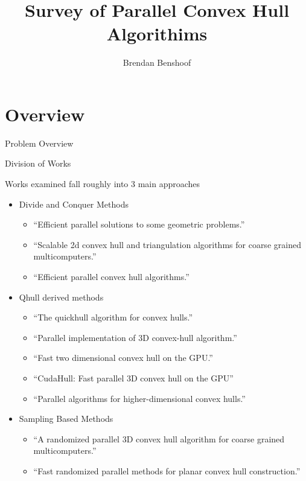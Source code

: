 \documentclass[11pt]{beamer}
\author{Brendan Benshoof}
\title{Survey of Parallel Convex Hull Algorithims}
\begin{document}
\setcounter{tocdepth}{3}
\begin{frame}
\titlepage
\end{frame}

\section{Overview}
\begin{frame}{Problem Overview}
\end{frame}


\begin{frame}{Division of Works}

Works examined fall roughly into 3 main approaches
\begin{itemize}
\item{ Divide and Conquer Methods}
\begin{itemize}
\item{``Efficient parallel solutions to some geometric problems.''}
\item{ ``Scalable 2d convex hull and triangulation algorithms for coarse grained multicomputers.''}
\item{``Efficient parallel convex hull algorithms.''}
\end{itemize}
\item{ Qhull derived methods}
\begin{itemize}
\item{``The quickhull algorithm for convex hulls.''}
\item{ ``Parallel implementation of 3D convex-hull algorithm.''}
\item{``Fast two dimensional convex hull on the GPU.''}
\item{``CudaHull: Fast parallel 3D convex hull on the GPU''}
\item{``Parallel algorithms for higher-dimensional convex hulls.''}
\end{itemize}
\item{ Sampling Based Methods}
\begin{itemize}
\item{``A randomized parallel 3D convex hull algorithm for coarse grained multicomputers.''}
\item{ ``Fast randomized parallel methods for planar convex hull construction.''}
\end{itemize}

\end{itemize}

\end{frame}
\end{document}
